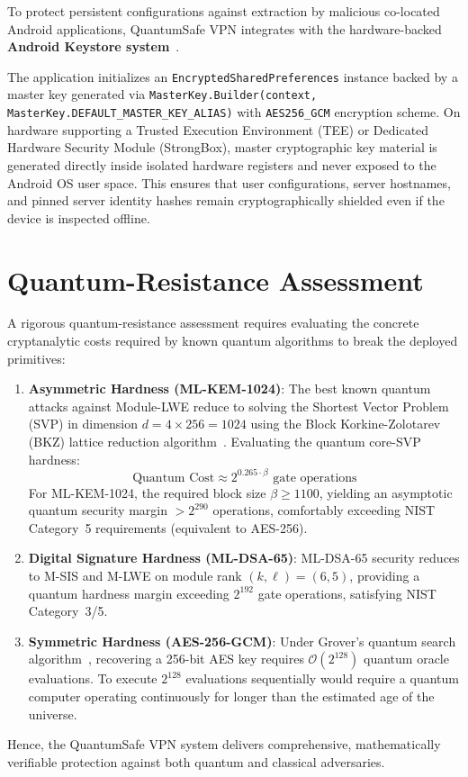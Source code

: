 To protect persistent configurations against extraction by malicious co-located Android applications, QuantumSafe VPN integrates with the hardware-backed \textbf{Android Keystore system}~\cite{android_keystore_docs}.

The application initializes an \texttt{EncryptedSharedPreferences} instance backed by a master key generated via \texttt{MasterKey.Builder(context, MasterKey.DEFAULT\_MASTER\_KEY\_ALIAS)} with \texttt{AES256\_GCM} encryption scheme. On hardware supporting a Trusted Execution Environment (TEE) or Dedicated Hardware Security Module (StrongBox), master cryptographic key material is generated directly inside isolated hardware registers and never exposed to the Android OS user space. This ensures that user configurations, server hostnames, and pinned server identity hashes remain cryptographically shielded even if the device is inspected offline.

\section{Quantum-Resistance Assessment}
\label{sec:quantum_resistance_assessment}

A rigorous quantum-resistance assessment requires evaluating the concrete cryptanalytic costs required by known quantum algorithms to break the deployed primitives:

\begin{enumerate}
    \item \textbf{Asymmetric Hardness (ML-KEM-1024)}: The best known quantum attacks against Module-LWE reduce to solving the Shortest Vector Problem (SVP) in dimension $d = 4 \times 256 = 1024$ using the Block Korkine-Zolotarev (BKZ) lattice reduction algorithm~\cite{albrecht2016hardness}. Evaluating the quantum core-SVP hardness:
    \begin{equation}
    \text{Quantum Cost} \approx 2^{0.265 \cdot \beta} \text{ gate operations}
    \end{equation}
    For ML-KEM-1024, the required block size $\beta \ge 1100$, yielding an asymptotic quantum security margin $> 2^{290}$ operations, comfortably exceeding NIST Category~5 requirements (equivalent to AES-256).
    \item \textbf{Digital Signature Hardness (ML-DSA-65)}: ML-DSA-65 security reduces to M-SIS and M-LWE on module rank $(k, \ell) = (6, 5)$, providing a quantum hardness margin exceeding $2^{192}$ gate operations, satisfying NIST Category~3/5.
    \item \textbf{Symmetric Hardness (AES-256-GCM)}: Under Grover's quantum search algorithm~\cite{grover1996fast}, recovering a 256-bit AES key requires $\mathcal{O}(2^{128})$ quantum oracle evaluations. To execute $2^{128}$ evaluations sequentially would require a quantum computer operating continuously for longer than the estimated age of the universe.
\end{enumerate}

Hence, the QuantumSafe VPN system delivers comprehensive, mathematically verifiable protection against both quantum and classical adversaries.
